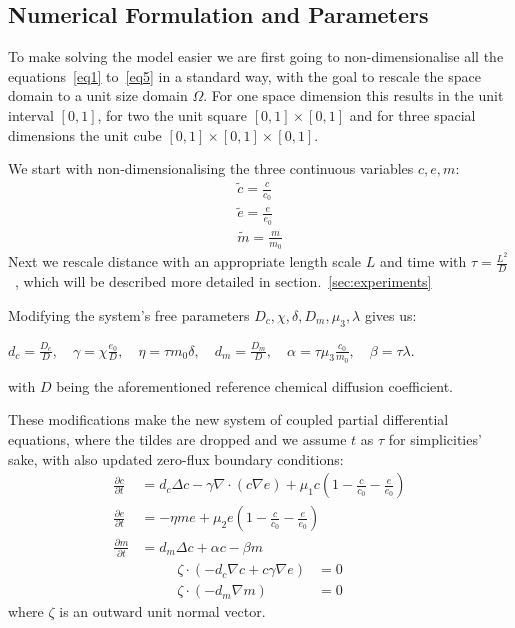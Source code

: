 \subsection{Numerical Formulation and Parameters}

To make solving the model easier we are first going to non-dimensionalise all the equations~\ref{eq1} to~\ref{eq5} in a standard way, with the goal to rescale the space domain to a unit size domain $\Omega$. For one space dimension this results in the unit interval $[0,1]$, for two the unit square $[0,1] \times [0,1]$ and for three spacial dimensions the unit cube $[0,1] \times [0,1] \times [0,1]$.

We start with non-dimensionalising the three continuous variables $c,e,m$:
\begin{align*}
    \tilde{c} = \frac{c}{c_0} \\
    \tilde{e} = \frac{e}{e_0} \\
    \tilde{m} = \frac{m}{m_0}  
\end{align*}
Next we rescale distance with an appropriate length scale $L$ and time with $\tau = \frac{L^2}{D}$~\cite{anderson_mathematical_2000}, which will be described more detailed in section.~\ref{sec:experiments}

Modifying the system's free parameters $D_c, \chi, \delta, D_m, \mu_3, \lambda$ gives us:  
\begin{center}
    $d_c = \frac{D_c}{D},\quad \gamma = \chi \frac{e_0}{D},\quad \eta = \tau m_0 \delta,\quad d_m = \frac{D_m}{D},\quad \alpha = \tau \mu_3 \frac{c_0}{m_0},\quad \beta = \tau \lambda$.
\end{center} 
with $D$ being the aforementioned reference chemical diffusion coefficient.

These modifications make the new system of coupled partial differential equations, where the tildes are dropped and we assume $t$ as $\tau$ for simplicities' sake, with also updated zero-flux boundary conditions:
\begin{align}
	\frac{\partial c}{\partial t} &= d_c \Delta c - \gamma \nabla \cdot (c\nabla e)  + \mu_1 c\left(1-\frac{c}{c_0}-\frac{e}{e_0}\right)\label{eq:6}\\
	\frac{\partial e}{\partial t} &= -\eta m e  + \mu_2 e\left(1-\frac{c}{c_0}-\frac{e}{e_0}\right)\label{eq:7}\\
	\frac{\partial m}{\partial t} &= d_m \Delta c + \alpha c - \beta m\label{eq:8}
\end{align}
\begin{align}
	\zeta \cdot (-d_c \nabla c + c \gamma \nabla e) &= 0\label{eq:9}\\
	\zeta \cdot (-d_m\nabla m ) &= 0\label{eq:10}
\end{align}
where $\zeta$ is an outward unit normal vector.
 
